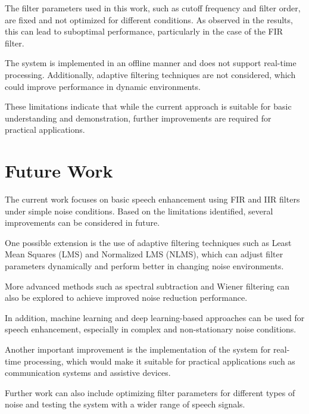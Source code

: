 \documentclass[conference]{IEEEtran}
\begin{document}
The filter parameters used in this work, such as cutoff frequency and filter order, are fixed and not optimized for different conditions. As observed in the results, this can lead to suboptimal performance, particularly in the case of the FIR filter.

The system is implemented in an offline manner and does not support real-time processing. Additionally, adaptive filtering techniques are not considered, which could improve performance in dynamic environments.

These limitations indicate that while the current approach is suitable for basic understanding and demonstration, further improvements are required for practical applications.

\section{Future Work}

The current work focuses on basic speech enhancement using FIR and IIR filters under simple noise conditions. Based on the limitations identified, several improvements can be considered in future.

One possible extension is the use of adaptive filtering techniques such as Least Mean Squares (LMS) and Normalized LMS (NLMS), which can adjust filter parameters dynamically and perform better in changing noise environments.

More advanced methods such as spectral subtraction and Wiener filtering can also be explored to achieve improved noise reduction performance.

In addition, machine learning and deep learning-based approaches can be used for speech enhancement, especially in complex and non-stationary noise conditions.

Another important improvement is the implementation of the system for real-time processing, which would make it suitable for practical applications such as communication systems and assistive devices.

Further work can also include optimizing filter parameters for different types of noise and testing the system with a wider range of speech signals.
\end{document}
